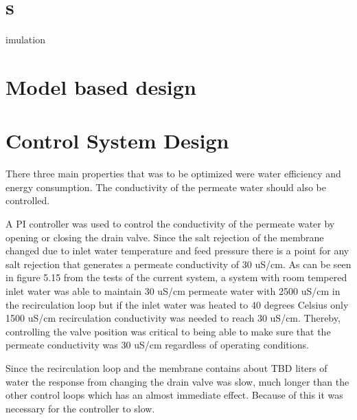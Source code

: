 \section{s}imulation

\section{Model based design}


\section{Control System Design}

There three main properties that was to be optimized were water efficiency and energy consumption. The conductivity of the permeate water should also be controlled.

A PI controller was used to control the conductivity of the permeate water by opening or closing the drain valve. Since the salt rejection of the membrane changed due to inlet water temperature and feed pressure there is a point for any salt rejection that generates a permeate conductivity of 30 uS/cm. As can be seen in figure 5.15 from the tests of the current system, a system with room tempered inlet water was able to maintain 30 uS/cm permeate water with 2500 uS/cm in the recirculation loop but if the inlet water was heated to 40 degrees Celsius only 1500 uS/cm recirculation conductivity was needed to reach 30 uS/cm. Thereby, controlling the valve position was critical to being able to make sure that the permeate conductivity was 30 uS/cm regardless of operating conditions. 

Since the recirculation loop and the membrane contains about TBD liters of water the response from changing the drain valve was slow, much longer than the other control loops which has an almost immediate effect. Because of this it was necessary for the controller to slow. 


